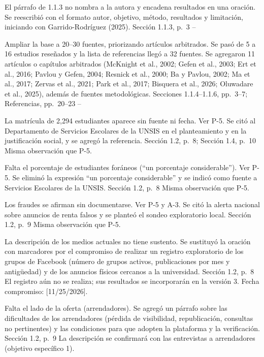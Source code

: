 \documentclass[10pt]{article}
\begin{document}
\begin{matriz}
  {El párrafo de 1.1.3 no nombra a la autora y encadena resultados en una oración.}
  {Se reescribió con el formato autor, objetivo, método, resultados y limitación, iniciando con Garrido-Rodríguez (2025).}
  {Sección 1.1.3, p.~3}
  {\Atendida}{--}{}

  {Ampliar la base a 20--30 fuentes, priorizando artículos arbitrados.}
  {Se pasó de 5 a 16 estudios reseñados y la lista de referencias llegó a 32 fuentes. Se agregaron 11 artículos o capítulos arbitrados (McKnight et al., 2002; Gefen et al., 2003; Ert et al., 2016; Pavlou y Gefen, 2004; Resnick et al., 2000; Ba y Pavlou, 2002; Ma et al., 2017; Zervas et al., 2021; Park et al., 2017; Bisquera et al., 2026; Oluwadare et al., 2025), además de fuentes metodológicas.}
  {Secciones 1.1.4--1.1.6, pp.~3--7; Referencias, pp.~20--23}
  {\Atendida}{--}{}

  {La matrícula de 2,294 estudiantes aparece sin fuente ni fecha.}
  {Ver P-5. Se citó al Departamento de Servicios Escolares de la UNSIS en el planteamiento y en la justificación social, y se agregó la referencia.}
  {Sección 1.2, p.~8; Sección 1.4, p.~10}
  {\Pendiente}{Misma observación que P-5.}{}

  {Falta el porcentaje de estudiantes foráneos (``un porcentaje considerable'').}
  {Ver P-5. Se eliminó la expresión ``un porcentaje considerable'' y se indicó como fuente a Servicios Escolares de la UNSIS.}
  {Sección 1.2, p.~8}
  {\Pendiente}{Misma observación que P-5.}{}

  {Los fraudes se afirman sin documentarse.}
  {Ver P-5 y A-3. Se citó la alerta nacional sobre anuncios de renta falsos y se planteó el sondeo exploratorio local.}
  {Sección 1.2, p.~9}
  {\Pendiente}{Misma observación que P-5.}{}

  {La descripción de los medios actuales no tiene sustento.}
  {Se sustituyó la oración con marcadores por el compromiso de realizar un registro exploratorio de los grupos de Facebook (número de grupos activos, publicaciones por mes y antigüedad) y de los anuncios físicos cercanos a la universidad.}
  {Sección 1.2, p.~8}
  {\Pendiente}
  {El registro aún no se realiza; sus resultados se incorporarán en la versión 3. Fecha compromiso: [11/25/2026].}
  {}

  {Falta el lado de la oferta (arrendadores).}
  {Se agregó un párrafo sobre las dificultades de los arrendadores (pérdida de visibilidad, republicación, consultas no pertinentes) y las condiciones para que adopten la plataforma y la verificación.}
  {Sección 1.2, p.~9}
  {\Atendida}
  {La descripción se confirmará con las entrevistas a arrendadores (objetivo específico 1).}
  {}


\end{matriz}
\end{document}
